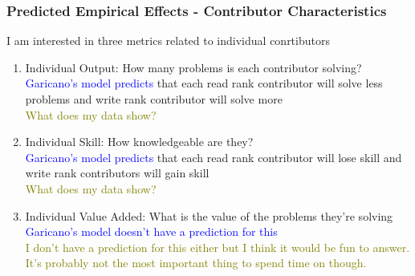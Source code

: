 \documentclass[source/paper/main.tex]{subfiles}
\begin{document}
\subsubsection{Predicted Empirical Effects - Contributor Characteristics}
I am interested in three metrics related to individual conrtibutors
\begin{enumerate}
    \item Individual Output: How many problems is each contributor solving?\\
    \textcolor{blue}{Garicano's model predicts } that each read rank contributor will solve less problems and write rank contributor will solve more\\
    \textcolor{olive}{What does my data show?}
    \item Individual Skill: How knowledgeable are they? \\
    \textcolor{blue}{Garicano's model predicts } that each read rank contributor will lose skill and write rank contributors will gain skill\\
    \textcolor{olive}{What does my data show?}
    \item Individual Value Added: What is the value of the problems they're solving\\
    \textcolor{blue}{Garicano's model doesn't have a prediction for this}\\
    \textcolor{olive}{I don't have a prediction for this either but I think it would be fun to answer. It's probably not the most important thing to spend time on though.}
\end{enumerate}
\end{document}
